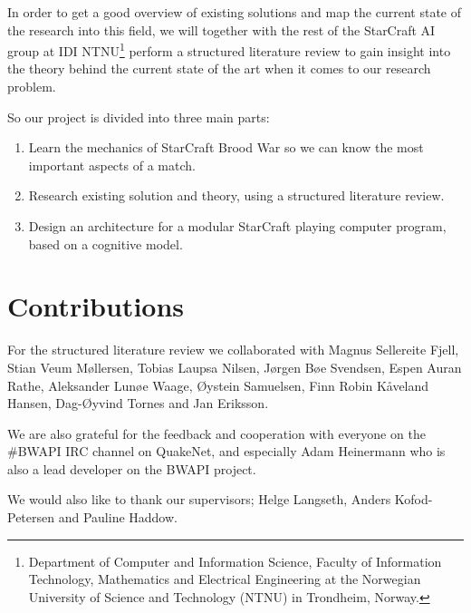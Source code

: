 In order to get a good overview of existing solutions and map the current state
of the research into this field, we will together with the rest of the StarCraft
AI group at IDI NTNU\footnote{Department of Computer and Information Science,
Faculty of Information Technology, Mathematics and Electrical Engineering at the
Norwegian University of Science and Technology (NTNU) in Trondheim, Norway.}
perform a structured literature review to gain insight into the theory behind
the current state of the art
when it comes to our research problem.

So our project is divided into three main parts:
\begin{enumerate}
  \item Learn the mechanics of StarCraft Brood War so we can know the most
important aspects of a match.
  \item Research existing solution and theory, using a structured literature
review.
  \item Design an architecture for a modular StarCraft playing computer
program, based on a cognitive model.
\end{enumerate}

\section{Contributions}
\label{sec:contributions}
For the structured literature review we collaborated with Magnus Sellereite
Fjell, Stian Veum M{\o}llersen, Tobias Laupsa Nilsen, J{\o}rgen B{\o}e Svendsen,
Espen Auran Rathe, Aleksander Lun{\o}e Waage, {\O}ystein Samuelsen, Finn Robin
K{\aa}veland Hansen, Dag-{\O}yvind Tornes and Jan Eriksson.

We are also grateful for the feedback and cooperation with everyone on the
\#BWAPI IRC channel on QuakeNet, and especially Adam Heinermann who is also a
lead developer on the BWAPI project.

We would also like to thank our supervisors; Helge Langseth, Anders
Kofod-Petersen and Pauline Haddow.

